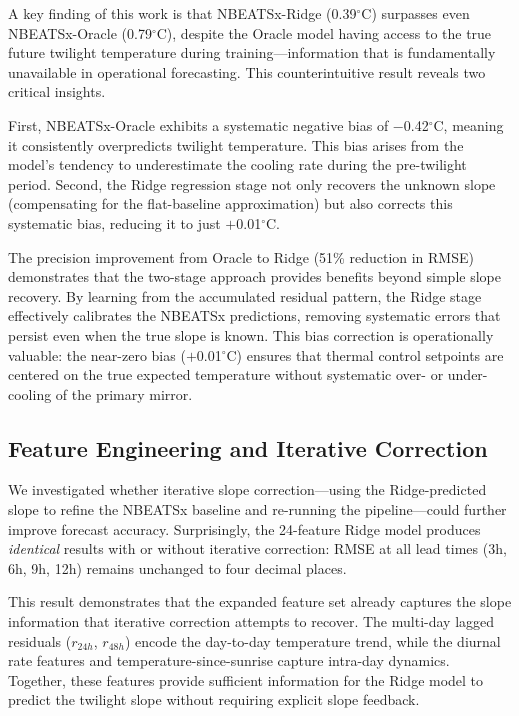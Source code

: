 \documentclass[twocolumn]{aastex631}
\begin{document}
A key finding of this work is that NBEATSx-Ridge (0.39$^\circ$C) surpasses even NBEATSx-Oracle (0.79$^\circ$C), despite the Oracle model having access to the true future twilight temperature during training---information that is fundamentally unavailable in operational forecasting. This counterintuitive result reveals two critical insights.

First, NBEATSx-Oracle exhibits a systematic negative bias of $-$0.42$^\circ$C, meaning it consistently overpredicts twilight temperature. This bias arises from the model's tendency to underestimate the cooling rate during the pre-twilight period. Second, the Ridge regression stage not only recovers the unknown slope (compensating for the flat-baseline approximation) but also corrects this systematic bias, reducing it to just $+$0.01$^\circ$C.

The precision improvement from Oracle to Ridge (51\% reduction in RMSE) demonstrates that the two-stage approach provides benefits beyond simple slope recovery. By learning from the accumulated residual pattern, the Ridge stage effectively calibrates the NBEATSx predictions, removing systematic errors that persist even when the true slope is known. This bias correction is operationally valuable: the near-zero bias ($+$0.01$^\circ$C) ensures that thermal control setpoints are centered on the true expected temperature without systematic over- or under-cooling of the primary mirror.

\subsection{Feature Engineering and Iterative Correction}

We investigated whether iterative slope correction---using the Ridge-predicted slope to refine the NBEATSx baseline and re-running the pipeline---could further improve forecast accuracy. Surprisingly, the 24-feature Ridge model produces \emph{identical} results with or without iterative correction: RMSE at all lead times (3h, 6h, 9h, 12h) remains unchanged to four decimal places.

This result demonstrates that the expanded feature set already captures the slope information that iterative correction attempts to recover. The multi-day lagged residuals ($r_{24h}$, $r_{48h}$) encode the day-to-day temperature trend, while the diurnal rate features and temperature-since-sunrise capture intra-day dynamics. Together, these features provide sufficient information for the Ridge model to predict the twilight slope without requiring explicit slope feedback.
\end{document}

